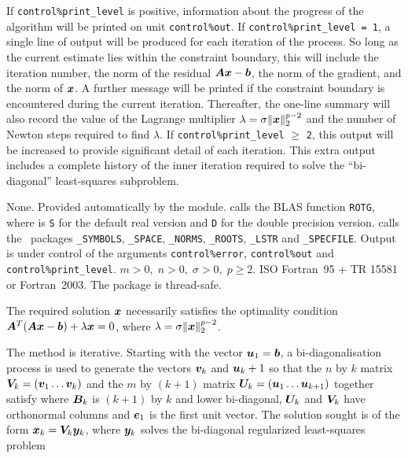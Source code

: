 \documentclass{galahad}
\newcommand{\packagename}{LS\-RT}
\begin{document}

\galinfo
If {\tt control\%print\_level} is positive, information about the progress
of the algorithm will be printed on unit {\tt control\-\%\-out}.
If {\tt control\%print\_level = 1}, a single line of output will be produced
for each iteration of the process. So long as the current estimate lies
within the constraint boundary, this will include
the iteration number, the norm of the residual ${\bm{A}}{\bm{x}}-{\bm{b}}$, the
norm of the gradient, and the norm of ${\bm{x}}$.
A further message will be printed
if the constraint boundary is encountered during the current iteration.
Thereafter, the one-line summary will also record the value of the Lagrange
multiplier $\lambda = \sigma \|{\bm{x}}\|_2^{p-2}$
and the number of Newton steps required to find $\lambda$.
If {\tt control\%print\_level} $\geq$ {\tt 2}, this
output will be increased to provide significant detail of each iteration.
This extra output includes a complete history of the inner iteration required
to solve the ``bi-diagonal'' least-squares subproblem.


\galgeneral

\galcommon None.
\galworkspace Provided automatically by the module.
\galroutines {\tt \packagename\_solve} calls the
BLAS function {\tt *ROTG}, where {\tt *} is {\tt S} for
the default real version and {\tt D} for the double precision version.
\galmodules {\tt \packagename\_solve} calls the \galahad\ packages
{\tt \libraryname\_SY\-M\-BOLS},
{\tt \libraryname\_SPACE},
{\tt \libraryname\_NORMS},
{\tt \libraryname\_\-ROOTS},
{\tt \libraryname\_LSTR} and
{\tt \libraryname\_SPECFILE}.
\galio Output is under control of the arguments
{\tt control\%error}, {\tt control\%out} and {\tt control\%print\_level}.
\galrestrictions $m > 0, \; n  >  0, \;  \sigma  >  0, \; p \geq 2$.
\galportability ISO Fortran~95 + TR 15581 or Fortran~2003.
The package is thread-safe.


\galmethod
The required solution ${\bm{x}}$ necessarily satisfies the optimality condition
${\bm{A}}^T ( {\bm{A}} {\bm{x}} - {\bm{b}} ) + \lambda {\bm{x}} = 0$, where
$\lambda = \sigma \|{\bm{x}}\|_2^{p-2}$.

\noindent
The method is iterative. Starting  with the vector ${\bm{u}}_1 = {\bm{b}}$, a
bi-diagonalisation process is used to generate the vectors ${\bm{v}}_k$ and
${\bm{u}}_k+1$ so that the $n$ by $k$ matrix ${\bm{V}}_k = ( {\bm{v}}_1 \ldots {\bm{v}}_k)$
and the $m$ by $(k+1)$ matrix ${\bm{U}}_k = ( {\bm{u}}_1 \ldots {\bm{u}}_{k+1})$
together satisfy
where ${\bm{B}}_k$ is $(k+1)$ by $k$ and lower bi-diagonal, ${\bm{U}}_k$ and
${\bm{V}}_k$ have orthonormal columns and ${\bm{e}}_1$ is the first unit vector.
The solution sought is of the form ${\bm{x}}_k = {\bm{V}}_k {\bm{y}}_k$, where ${\bm{y}}_k$
solves the bi-diagonal regularized least-squares problem
\end{document}
